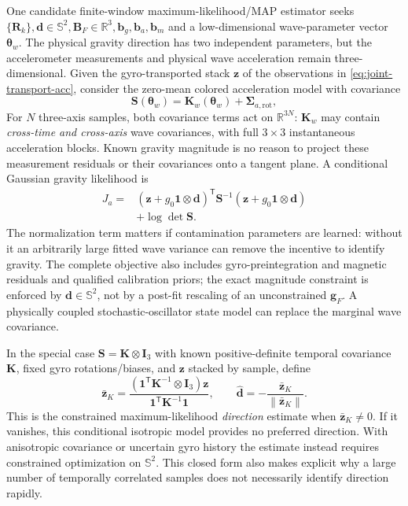 \documentclass[conference]{IEEEtran}
\DeclareRobustCommand{\vct}[1]{\bm{#1}}
\DeclareRobustCommand{\mat}[1]{\bm{#1}}
\newcommand{\R}{\mathbb{R}}
\newcommand{\T}{^{\mathsf T}}
\newcommand{\norm}[1]{\left\lVert#1\right\rVert}
\begin{document}
One candidate finite-window maximum-likelihood/MAP estimator seeks
$\{\mat R_k\},\vct d\in\mathbb S^2,\vct B_F\in\R^3,
\vct b_g,\vct b_a,\vct b_m$ and a low-dimensional
wave-parameter vector $\vct\theta_w$.  The physical gravity
direction has two independent parameters, but the accelerometer
measurements and physical wave acceleration remain three-dimensional.
Given the gyro-transported stack $\vct z$ of the observations in
\cref{eq:joint-transport-acc}, consider the zero-mean colored
acceleration model with covariance
\begin{equation}
\mat S(\vct\theta_w)=\mat K_w(\vct\theta_w)
                  +\mat\Sigma_{a,\mathrm{rot}},
\label{eq:joint-wave-cov}
\end{equation}
For $N$ three-axis samples, both covariance terms act on
$\R^{3N}$: $\mat K_w$ may contain \emph{cross-time and cross-axis}
wave covariances, with full $3\times3$ instantaneous acceleration
blocks.  Known gravity magnitude is no reason to project these
measurement residuals or their covariances onto a tangent plane.  A
conditional Gaussian gravity likelihood is
\begin{align}
J_a={}&
(\vct z+g_0\vct 1\otimes\vct d)\T
 \mat S^{-1}(\vct z+g_0\vct 1\otimes\vct d)
\nonumber\\
&+\log\det\mat S.
\label{eq:joint-wave-ml}
\end{align}
The normalization term matters if contamination parameters are
learned: without it an arbitrarily large fitted wave variance can
remove the incentive to identify gravity.  The complete objective
also includes gyro-preintegration and magnetic residuals and
qualified calibration priors; the exact magnitude constraint is
enforced by $\vct d\in\mathbb S^2$, not by a post-fit rescaling
of an unconstrained $\vct g_F$.  A physically coupled
stochastic-oscillator state model can replace the marginal
wave covariance.

In the special case
$\mat S=\mat K\otimes\mat I_3$ with known positive-definite
temporal covariance $\mat K$, fixed gyro rotations/biases, and
$\vct z$ stacked by sample, define
\begin{equation}
\bar{\vct z}_{K}
=\frac{(\vct 1\T\mat K^{-1}\otimes\mat I_3)\vct z}
       {\vct 1\T\mat K^{-1}\vct 1},\qquad
\hat{\vct d}=-\frac{\bar{\vct z}_{K}}{\norm{\bar{\vct z}_{K}}}.
\label{eq:joint-unit-gravity-solution}
\end{equation}
This is the constrained maximum-likelihood \emph{direction}
estimate when $\bar{\vct z}_{K}\ne 0$.  If it vanishes, this
conditional isotropic model provides no preferred direction.
With anisotropic covariance or uncertain gyro history the estimate
instead requires constrained optimization on $\mathbb S^2$.
This closed form also makes explicit why a large number of
temporally correlated samples does not necessarily identify
direction rapidly.
\end{document}

